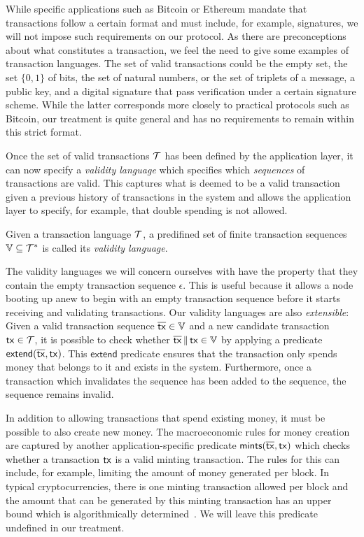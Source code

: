 While specific applications such as Bitcoin or Ethereum mandate that
transactions follow a certain format and must include, for example, signatures,
we will not impose such requirements on our protocol. As there are
preconceptions about what constitutes a transaction, we feel the need to give
some examples of transaction languages. The set of valid transactions could be
the empty set, the set $\{0, 1\}$ of bits, the set of natural numbers, or the
set of triplets of a message, a public key, and a digital signature that pass
verification under a certain signature scheme. While the latter corresponds more
closely to practical protocols such as Bitcoin, our treatment is quite general
and has no requirements to remain within this strict format.

Once the set of valid transactions $\mathcal{T}$ has been defined by the
application layer, it can now specify a \emph{validity language} which specifies
which \emph{sequences} of transactions are valid. This captures what is deemed
to be a valid transaction given a previous history of transactions in the
system and allows the application layer to specify, for example, that double
spending is not allowed.

\begin{definition}
  Given a transaction language $\mathcal{T}$, a predifined set of finite
  transaction sequences $\mathbb{V} \subseteq \mathcal{T}^*$ is called its
  \emph{validity language}.
\end{definition}

The validity languages we will concern ourselves with have the property that
they contain the empty transaction sequence $\epsilon$. This is useful because
it allows a node booting up anew to begin with an empty transaction sequence
before it starts receiving and validating transactions. Our validity languages
are also \emph{extensible}: Given a valid transaction sequence $\overline{\mathsf{tx}}
\in \mathbb{V}$ and a new candidate transaction $\mathsf{tx} \in \mathcal{T}$, it is
possible to check whether $\overline{\mathsf{tx}} \,\|\, \mathsf{tx} \in \mathbb{V}$ by applying
a predicate $\textsf{extend}(\overline{\mathsf{tx}}, \mathsf{tx})$. This $\textsf{extend}$
predicate ensures that the transaction only spends money that belongs to it and
exists in the system. Furthermore, once a
transaction which invalidates the sequence has been added to the sequence, the
sequence remains invalid.

In addition to allowing transactions that spend existing money, it must be
possible to also create new money. The macroeconomic rules for money creation
are captured by another application-specific predicate
$\textsf{mints}(\overline{\mathsf{tx}}, \mathsf{tx})$ which checks whether a transaction $\mathsf{tx}$
is a valid minting transaction. The rules for this can include, for example,
limiting the amount of money generated per block.
In typical cryptocurrencies, there is one minting transaction allowed per block
and the amount that can be generated by this minting transaction has an
upper bound which is algorithmically determined~\cite{equitability}.
We will leave this predicate undefined in our treatment.

